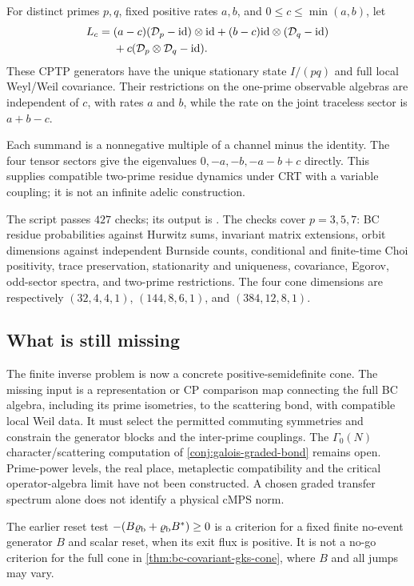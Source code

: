 \begin{proposition}
\label{prop:bc-compatible-prime-coupling}
For distinct primes $p,q$, fixed positive rates $a,b$, and
$0\le c\le\min(a,b)$, let
\[
 \begin{split}
 L_c={}&(a-c)(\mathcal D_p-\mathrm{id})\otimes\mathrm{id}
 +(b-c)\mathrm{id}\otimes(\mathcal D_q-\mathrm{id})\\
 &+c(\mathcal D_p\otimes\mathcal D_q-\mathrm{id}).
 \end{split}
\]
These CPTP generators have the unique stationary state $I/(pq)$ and full
local Weyl/Weil covariance. Their restrictions on the one-prime observable
algebras are independent of $c$, with rates $a$ and $b$, while the rate on
the joint traceless sector is $a+b-c$.
\end{proposition}

Each summand is a nonnegative multiple of a channel minus the identity.
The four tensor sectors give the eigenvalues $0,-a,-b,-a-b+c$ directly.
This supplies compatible two-prime residue dynamics under CRT with a
variable coupling; it is not an infinite adelic construction.

\begin{numerical}
\label{num:bc-symmetry-generators}
The script  passes $427$ checks;
its output is . The checks cover
$p=3,5,7$: BC residue probabilities against Hurwitz sums, invariant matrix
extensions, orbit dimensions against independent Burnside counts,
conditional and finite-time Choi positivity, trace preservation,
stationarity and uniqueness, covariance, Egorov, odd-sector spectra, and
two-prime restrictions. The four cone dimensions are respectively
$(32,4,4,1)$, $(144,8,6,1)$, and $(384,12,8,1)$.
\end{numerical}

\subsection{What is still missing}

The finite inverse problem is now a concrete positive-semidefinite cone.
The missing input is a representation or CP comparison map connecting the
full BC algebra, including its prime isometries, to the scattering bond,
with compatible local Weil data. It must select the permitted commuting
symmetries and constrain the generator blocks and the inter-prime couplings.
The $\Gamma_0(N)$ character/scattering computation of
\cref{conj:galois-graded-bond} remains open. Prime-power levels, the real
place, metaplectic compatibility and the critical operator-algebra limit
have not been constructed. A chosen graded transfer spectrum alone does
not identify a physical cMPS norm.

The earlier reset test $-(B\varrho_{\mathrm b}+\varrho_{\mathrm b} B^*)\ge0$ is a criterion for a fixed
finite no-event generator $B$ and scalar reset, when its exit flux is
positive. It is not a no-go criterion for the full cone in
\cref{thm:bc-covariant-gks-cone}, where $B$ and all jumps may vary.
